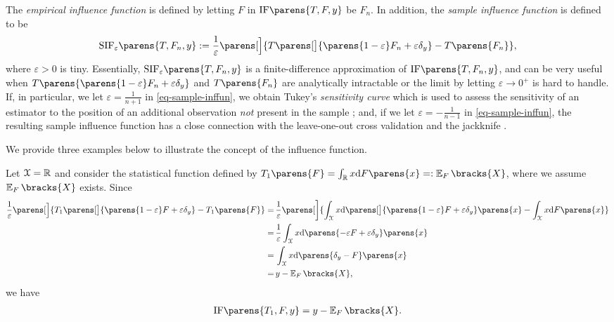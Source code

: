 The \textit{empirical influence function} \parencite[Definition 2.18 in][]{Wasserman2006-lj} is defined by letting $F$ in $\mathrm{IF} \parens{T, F, y}$ be $F_n$. In addition, the \textit{sample influence function} \parencite{Hampel1974-oe, Cook1982-gj} is defined to be 
\begin{align}\label{eq-sample-inffun}
	\mathrm{SIF}_{\varepsilon} \parens{T, F_n, y} := \frac{1}{\varepsilon} \parens[\Big]{T \parens[\big]{\parens{1 - \varepsilon} F_n + \varepsilon \delta_y} - T \parens{F_n}}, 
\end{align}
where $\varepsilon > 0$ is tiny. Essentially, $\mathrm{SIF}_{\varepsilon} \parens{T, F_n, y}$ is a finite-difference approximation of $\mathrm{IF} \parens{T, F_n, y}$, and can be very useful when $T \parens{\parens{1 - \varepsilon} F_n + \varepsilon \delta_y}$ and $T \parens{F_n}$ are analytically intractable or the limit by letting $\varepsilon \to 0^+$ is hard to handle. If, in particular, we let $\varepsilon = \frac{1}{n+1}$ in \eqref{eq-sample-inffun}, we obtain Tukey's \textit{sensitivity curve} which is used to assess the sensitivity of an estimator to the position of an additional observation \emph{not} present in the sample \parencite{Hampel1986-ig}; and, if we let $\varepsilon = -\frac{1}{n-1}$ in \eqref{eq-sample-inffun}, the resulting sample influence function has a close connection with the leave-one-out cross validation and the jackknife \parencite[see Example 3.18 in][for a discussion]{Wasserman2006-lj}. 

We provide three examples below to illustrate the concept of the influence function. 

\begin{example}[Mean]\label{example-inf-fun-mean}
	Let $\mathcal{X} = \mathbb{R}$ and consider the statistical function defined by $T_1 \parens{F} = \int_{\Real} x \diff F \parens{x} =: \E_F \bracks{X}$, where we assume $\E_F \bracks{X}$ exists. Since 
	\begin{align*}
		\frac{1}{\varepsilon} \parens[\Big]{T_1 \parens[\big]{\parens{1 - \varepsilon} F + \varepsilon \delta_y} - T_1 \parens{F} } 
		= & \, \frac{1}{\varepsilon} \parens[\bigg]{\int_{\calX} x \diff \parens[\big]{\parens{1 - \varepsilon} F + \varepsilon \delta_y} \parens{x} - \int_{\calX} x \diff F \parens{x} } \nonumber \\ 
		= & \, \frac{1}{\varepsilon} \int_{\calX} x \diff \parens{ - \varepsilon F + \varepsilon \delta_y} \parens{x} \nonumber \\ 
		= & \, \int_{\calX} x \diff \parens{\delta_y - F} \parens{x} \\ 
		= & \, y - \E_F \bracks{X}, 
	\end{align*}
	we have 
	\begin{align}\label{eq-inf-fun-mean}
		\mathrm{IF} \parens{T_1, F, y} = y - \E_F \bracks{X}. 
	\end{align}
\end{example}


